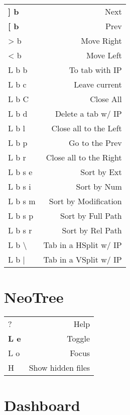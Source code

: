 \documentclass[
  ,landscape
  ,columns=4
]{cheatsheet}
\begin{document}
\begin{tabular}{lr}
	\textbf{{]} b}     & Next                   \\
	\textbf{{[} b}     & Prev                   \\
	> b                & Move Right             \\
	< b                & Move Left              \\
	L b b              & To tab with IP         \\
	L b c              & Leave current          \\
	L b C              & Close All              \\
	L b d              & Delete a tab w/ IP     \\
	L b l              & Close all to the Left  \\
	L b p              & Go to the Prev         \\
	L b r              & Close all to the Right \\
	L b s e            & Sort by Ext            \\
	L b s i            & Sort by Num            \\
	L b s m            & Sort by Modification   \\
	L b s p            & Sort by Full Path      \\
	L b s r            & Sort by Rel Path       \\
	L b \textbackslash & Tab in a HSplit w/ IP  \\
	L b {|}            & Tab in a VSplit w/ IP  \\
\end{tabular}

\section{NeoTree}

\begin{tabular}{lr}
	?            & Help              \\
	\textbf{L e} & Toggle            \\
	L o          & Focus             \\
	H            & Show hidden files \\
\end{tabular}

\section{Dashboard}
\end{document}
